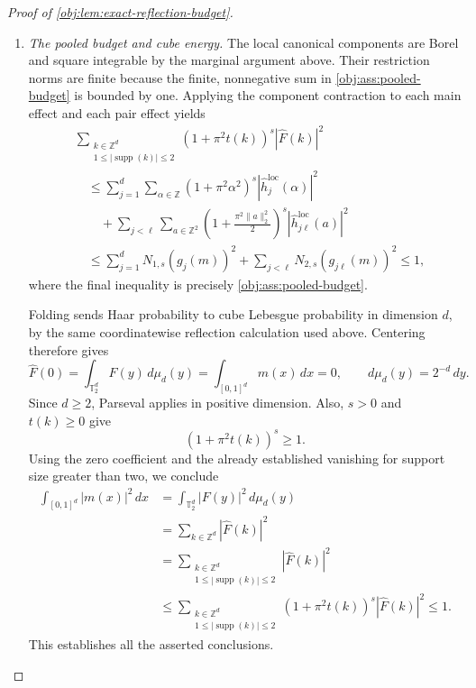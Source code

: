 \documentclass[11pt]{article}
\begin{document}
\begin{proof}[Proof of \cref{obj:lem:exact-reflection-budget}]
\begin{enumerate}
\item \textit{The pooled budget and cube energy.}
The local canonical components are Borel and square integrable by the marginal argument above. Their restriction norms are finite because the finite, nonnegative sum in \cref{obj:ass:pooled-budget} is bounded by one. Applying the component contraction to each main effect and each pair effect yields
\[
\begin{aligned}
&\sum_{\substack{k\in\mathbb Z^d\\1\leq|\operatorname{supp}(k)|\leq2}}
(1+\pi^2t(k))^s|\widehat F(k)|^2\\
&\quad\leq
\sum_{j=1}^d\sum_{\alpha\in\mathbb Z}
(1+\pi^2\alpha^2)^s|\widehat h_j^{\mathrm{loc}}(\alpha)|^2\\
&\qquad+
\sum_{j<\ell}\sum_{a\in\mathbb Z^2}
\left(1+\frac{\pi^2\|a\|_2^2}{2}\right)^s
|\widehat h_{j\ell}^{\mathrm{loc}}(a)|^2\\
&\quad\leq
\sum_{j=1}^dN_{1,s}(g_j(m))^2
+
\sum_{j<\ell}N_{2,s}(g_{j\ell}(m))^2
\leq1,
\end{aligned}
\]
where the final inequality is precisely \cref{obj:ass:pooled-budget}.

Folding sends Haar probability to cube Lebesgue probability in dimension \(d\), by the same coordinatewise reflection calculation used above. Centering therefore gives
\[
\widehat F(0)
=
\int_{\mathbb T_2^d}F(y)\,d\mu_d(y)
=
\int_{[0,1]^d}m(x)\,dx
=
0,
\qquad d\mu_d(y)=2^{-d}\,dy.
\]
Since \(d\geq2\), Parseval applies in positive dimension. Also, \(s>0\) and \(t(k)\geq0\) give
\[
(1+\pi^2t(k))^s\geq1.
\]
Using the zero coefficient and the already established vanishing for support size greater than two, we conclude
\[
\begin{aligned}
\int_{[0,1]^d}|m(x)|^2\,dx
&=
\int_{\mathbb T_2^d}|F(y)|^2\,d\mu_d(y)\\
&=
\sum_{k\in\mathbb Z^d}|\widehat F(k)|^2\\
&=
\sum_{\substack{k\in\mathbb Z^d\\1\leq|\operatorname{supp}(k)|\leq2}}
|\widehat F(k)|^2\\
&\leq
\sum_{\substack{k\in\mathbb Z^d\\1\leq|\operatorname{supp}(k)|\leq2}}
(1+\pi^2t(k))^s|\widehat F(k)|^2
\leq1.
\end{aligned}
\]
This establishes all the asserted conclusions.
\end{enumerate}
\end{proof}
\end{document}
